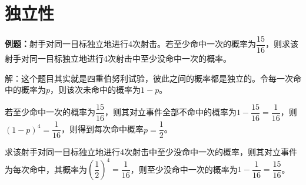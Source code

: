 
\section{独立性}

\textbf{例题：}射手对同一目标独立地进行4次射击。若至少命中一次的概率为$\dfrac{15}{16}$，则求该射手对同一目标独立地进行4次射击中至少没命中一次的概率。

解：这个题目其实就是四重伯努利试验，彼此之间的概率都是独立的。令每一次命中的概率为$p$，则该次未命中的概率为$1-p$。

若至少命中一次的概率为$\dfrac{15}{16}$，则其对立事件全部不命中的概率为$1-\dfrac{15}{16}=\dfrac{1}{16}$，则$(1-p)^4=\dfrac{1}{16}$，则得到每次命中概率$p=\dfrac{1}{2}$。

求该射手对同一目标独立地进行4次射击中至少没命中一次的概率，则其对立事件为每次命中，其概率为$\left(\dfrac{1}{2}\right)^4=\dfrac{1}{16}$，则至少没命中一次的概率为$1-\dfrac{1}{16}=\dfrac{15}{16}$。

%
